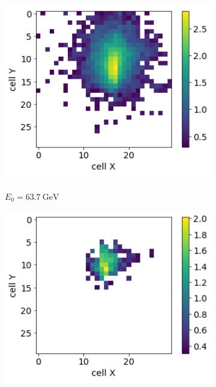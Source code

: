 \begin{figure}
\begin{subfigure}{0.24\textwidth}
  \end{subfigure}\\
   \begin{subfigure}{0.24\textwidth}
    \centering
    \includegraphics[width=1\textwidth]{figures/1_gen.png}
    \caption{\\$E_0 = 63.7~\text{GeV}$ }%
  \end{subfigure}
  \begin{subfigure}{0.24\textwidth}
    \centering
    \includegraphics[width=1\textwidth]{figures/2_gen.png}

\end{subfigure}
\end{figure}
